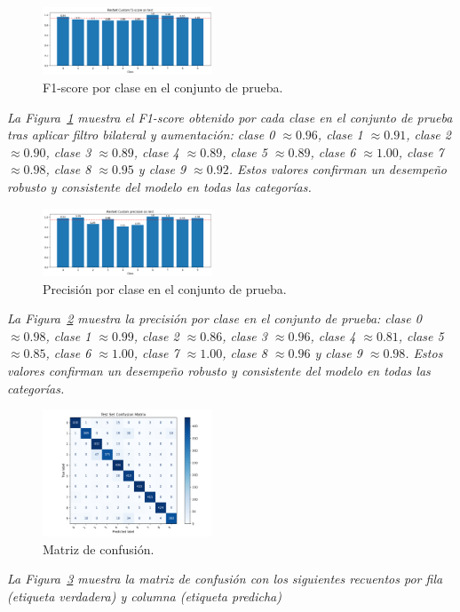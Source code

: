 \documentclass[conference]{IEEEtran}
\begin{document}
\begin{figure}[H]
    \centering
    \includegraphics[width=0.45\textwidth]{graphics-resnet-bilateral/resnet_bilateral_with_class_f1.png}
    \caption{F1-score por clase en el conjunto de prueba.}
    \label{fig:resnet_bilateral_with_class_f1}
\end{figure}
\noindent\textit{%
La Figura~\ref{fig:resnet_bilateral_with_class_f1} muestra el F1-score obtenido por cada clase en el conjunto de prueba tras aplicar filtro bilateral y aumentación: clase 0 \(\approx0.96\), clase 1 \(\approx0.91\), clase 2 \(\approx0.90\), clase 3 \(\approx0.89\), clase 4 \(\approx0.89\), clase 5 \(\approx0.89\), clase 6 \(\approx1.00\), clase 7 \(\approx0.98\), clase 8 \(\approx0.95\) y clase 9 \(\approx0.92\). Estos valores confirman un desempeño robusto y consistente del modelo en todas las categorías.%
}

\begin{figure}[H]
    \centering
    \includegraphics[width=0.45\textwidth]{graphics-resnet-bilateral/resnet_bilateral_with_class_precision.png}
    \caption{Precisión por clase en el conjunto de prueba.}
    \label{fig:resnet_bilateral_with_class_precision}
\end{figure}
\noindent\textit{%
La Figura~\ref{fig:resnet_bilateral_with_class_precision} muestra la precisión por clase en el conjunto de prueba: clase 0 \(\approx0.98\), clase 1 \(\approx0.99\), clase 2 \(\approx0.86\), clase 3 \(\approx0.96\), clase 4 \(\approx0.81\), clase 5 \(\approx0.85\), clase 6 \(\approx1.00\), clase 7 \(\approx1.00\), clase 8 \(\approx0.96\) y clase 9 \(\approx0.98\). Estos valores confirman un desempeño robusto y consistente del modelo en todas las categorías.%
}

\begin{figure}[H]
    \centering
    \includegraphics[width=0.45\textwidth]{graphics-resnet-bilateral/resnet_bilateral_with_confusion_matrix.png}
    \caption{Matriz de confusión.}
    \label{fig:resnet_bilateral_with_confusion_matrix}
\end{figure}
\noindent\textit{%
La Figura~\ref{fig:resnet_bilateral_with_confusion_matrix} muestra la matriz de confusión con los siguientes recuentos por fila (etiqueta verdadera) y columna (etiqueta predicha)
}
\end{document}

